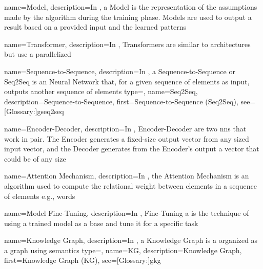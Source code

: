 
{
  name={Model},
  description={In , a Model is the representation of the assumptions made by the algorithm during the training phase. Models are used to output a result based on a provided input and the learned patterns}
}

{
  name={Transformer},
  description={In , Transformers are similar to  architectures but use a parallelized }
}

{
  name={Sequence-to-Sequence},
  description={In , a Sequence-to-Sequence or Seq2Seq is an  Neural Network that, for a given sequence of elements as input, outputs another sequence of elements}
}
{
  type=\acronymtype,
  name={Seq2Seq},
  description={Sequence-to-Sequence},
  first={Sequence-to-Sequence (Seq2Seq)},
  see=[Glossary:]{gseq2seq}
}

{
  name={Encoder-Decoder},
  description={In , Encoder-Decoder are two \glspl{nn} that work in pair. The Encoder generates a fixed-size output vector from any sized input vector, and the Decoder generates from the Encoder's output a vector that could be of any size}
}

{
  name={Attention Mechanism},
  description={In , the Attention Mechanism is an algorithm used to compute the relational weight between elements in a sequence of elements e.g., words}
}

{
  name={Model Fine-Tuning},
  description={In , Fine-Tuning a  is the technique of using a trained  model as a base and tune it for a specific task}
}

{
  name={Knowledge Graph},
  description={In , a Knowledge Graph is a  organized as a graph using semantics}
}
{
  type=\acronymtype,
  name={KG},
  description={Knowledge Graph},
  first={Knowledge Graph (KG)},
  see=[Glossary:]{gkg}
}

